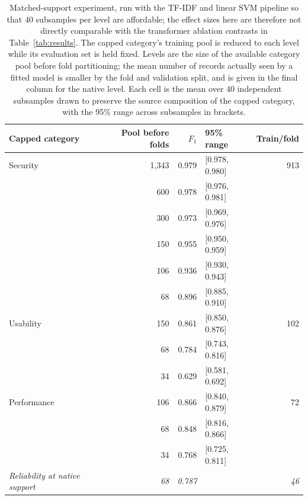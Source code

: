 \documentclass[11pt,a4paper]{article}
\begin{document}
\begin{table}[htbp]
\centering
\caption{Matched-support experiment, run with the TF-IDF and linear SVM pipeline so that 40 subsamples
per level are affordable; the effect sizes here are therefore not directly comparable with the
transformer ablation contrasts in Table~\ref{tab:results}. The capped category's training pool is reduced
to each level while its evaluation set is held fixed. Levels are the size of the available category
pool before fold partitioning; the mean number of records actually seen by a fitted model is
smaller by the fold and validation split, and is given in the final column for the native
level. Each cell is the mean over 40 independent subsamples drawn to preserve the source
composition of the capped category, with the 95\% range across subsamples in brackets.}
\label{tab:matched}
\small
\setlength{\tabcolsep}{5pt}
\begin{tabular}{@{}lrrl r@{}}
\toprule
\textbf{Capped category} & \textbf{Pool before folds} & \textbf{$F_1$} & \textbf{95\% range} & \textbf{Train/fold}\\
\midrule
Security & 1{,}343 & 0.979 & [0.978, 0.980] & 913\\
         &    600 & 0.978 & [0.976, 0.981] & \\
         &    300 & 0.973 & [0.969, 0.976] & \\
         &    150 & 0.955 & [0.950, 0.959] & \\
         &    106 & 0.936 & [0.930, 0.943] & \\
         &     68 & 0.896 & [0.885, 0.910] & \\
\addlinespace
Usability &   150 & 0.861 & [0.850, 0.876] & 102\\
          &    68 & 0.784 & [0.743, 0.816] & \\
          &    34 & 0.629 & [0.581, 0.692] & \\
\addlinespace
Performance & 106 & 0.866 & [0.840, 0.879] & 72\\
            &  68 & 0.848 & [0.816, 0.866] & \\
            &  34 & 0.768 & [0.725, 0.811] & \\
\midrule
\emph{Reliability at native support} & \emph{68} & \emph{0.787} & & \emph{46}\\
\bottomrule
\end{tabular}
\setlength{\tabcolsep}{6pt}
\end{table}
\end{document}
